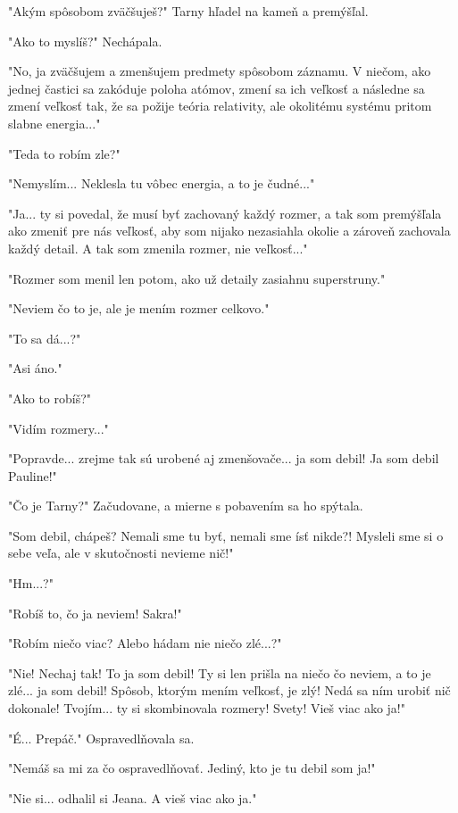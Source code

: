 \documentclass{book}
\begin{document}
"$ $Akým spôsobom zväčšuješ?"$ $  Tarny hľadel na kameň a premýšľal.

"$ $Ako to myslíš?"$ $  Nechápala.

"$ $No, ja zväčšujem a zmenšujem predmety spôsobom záznamu. V niečom, ako jednej častici sa zakóduje poloha atómov, zmení sa ich veľkosť a následne sa zmení veľkosť tak, že sa požije teória relativity, ale okolitému systému pritom slabne energia..."$ $ 

"$ $Teda to robím zle?"$ $ 

"$ $Nemyslím... Neklesla tu vôbec energia, a to je čudné..."$ $ 

"$ $Ja... ty si povedal, že musí byť zachovaný každý rozmer, a tak som premýšľala ako zmeniť pre nás veľkosť, aby som nijako nezasiahla okolie a zároveň zachovala každý detail. A tak som zmenila rozmer, nie veľkosť..."$ $ 

"$ $Rozmer som menil len potom, ako už detaily zasiahnu superstruny."$ $ 

"$ $Neviem čo to je, ale je mením rozmer celkovo."$ $ 

"$ $To sa dá...?"$ $ 

"$ $Asi áno."$ $ 

"$ $Ako to robíš?"$ $ 

"$ $Vidím rozmery..."$ $ 

"$ $Popravde... zrejme tak sú urobené aj zmenšovače... ja som debil! Ja som debil Pauline!"$ $ 

"$ $Čo je Tarny?"$ $  Začudovane, a mierne s pobavením sa ho spýtala.

"$ $Som debil, chápeš? Nemali sme tu byť, nemali sme ísť nikde?! Mysleli sme si o sebe veľa, ale v skutočnosti nevieme nič!"$ $ 

"$ $Hm...?"$ $ 

"$ $Robíš to, čo ja neviem! Sakra!"$ $ 

"$ $Robím niečo viac? Alebo hádam nie niečo zlé...?"$ $ 

"$ $Nie! Nechaj tak! To ja som debil! Ty si len prišla na niečo čo neviem, a to je zlé... ja som debil! Spôsob, ktorým mením veľkosť, je zlý! Nedá sa ním urobiť nič dokonale! Tvojím... ty si skombinovala rozmery! Svety! Vieš viac ako ja!"$ $ 

"$ $É... Prepáč."$ $  Ospravedlňovala sa.

"$ $Nemáš sa mi za čo ospravedlňovať. Jediný, kto je tu debil som ja!"$ $ 

"$ $Nie si... odhalil si Jeana. A vieš viac ako ja."$ $ 
\end{document}
